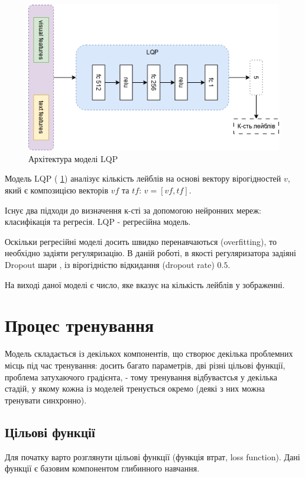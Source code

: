 \documentclass{udstu}
\begin{document}
\begin{figure}[!ht]
	\centering
	\includegraphics[width=1.0\textwidth]{PNG/lqp}
	\caption{Архітектура моделі LQP}
	\label{figure:lqp}
\end{figure}

Модель LQP (\figurename{ \ref{figure:lqp}}) аналізує кількість лейблів на основі вектору вірогідностей $v$,
який є композицією векторів $vf$ та $tf$: $v = [vf, tf]$.

Існує два підходи до визначення к-сті за допомогою нейронних мереж: класифікація та регресія.
LQP - регресійна модель.

Оскільки регресійні моделі досить швидко перенавчаються (overfitting), то необхідно задіяти регуляризацію.
В даній роботі, в якості регуляризатора задіяні Dropout шари \cite{dropout}, із вірогідністю відкидання (dropout rate) $0.5$.

На виході даної моделі є число, яке вказує на кількість лейблів у зображенні.


\section{Процес тренування}

Модель складається із декількох компонентів, що створює декілька проблемних місць під час тренування:
досить багато параметрів, дві різні цільові функції, проблема затухаючого градієнта, -
тому тренування відбуваєтсья у декілька стадій, у якому кожна із моделей тренується окремо
(деякі з них можна тренувати синхронно).


\subsection{Цільові функції}

Для початку варто розглянути цільові функції (функція втрат, loss function).
Дані функції є базовим компонентом глибинного навчання.
\end{document}
